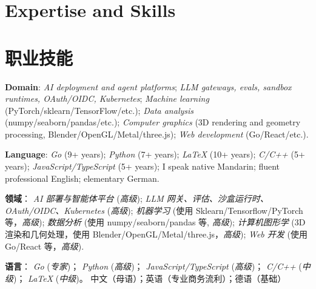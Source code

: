  {
  \section{\textbf{Expertise and Skills}}
}{
  \section{\textbf{职业技能}}
}
 {
  \small
  \resumeSubHeadingListStart
  \item{\textbf{Domain}:
  \emph{AI deployment and agent platforms};
  \emph{LLM gateways, evals, sandbox runtimes, OAuth/OIDC, Kubernetes};
  \emph{Machine learning} (PyTorch/sklearn/TensorFlow/etc.);
  \emph{Data analysis} (numpy/seaborn/pandas/etc.);
  \emph{Computer graphics} (3D rendering and geometry processing, Blender/OpenGL/Metal/three.js);
  \emph{Web development} (Go/React/etc.).
  }
  \item{\textbf{Language}:
  \emph{Go} (9+ years);
  \emph{Python} (7+ years);
  \emph{\LaTeX} (10+ years);
  \emph{C/C++} (5+ years);
  \emph{JavaScript/TypeScript} (5+ years);
  I speak native Mandarin; fluent professional English; elementary German.
  }
  \resumeSubHeadingListEnd
}{
  \small
  \resumeSubHeadingListStart
  \item{\textbf{领域}：
  \emph{AI 部署与智能体平台} (\emph{高级});
  \emph{LLM 网关、评估、沙盒运行时、OAuth/OIDC、Kubernetes} (\emph{高级});
  \emph{机器学习} (使用 Sklearn/Tensorflow/PyTorch 等，\emph{高级});
  \emph{数据分析} (使用 numpy/seaborn/pandas 等, \emph{高级});
  \emph{计算机图形学} (3D 渲染和几何处理，使用 Blender/OpenGL/Metal/three.js，\emph{高级});
  \emph{Web 开发} (使用 Go/React 等，\emph{高级}).
  }
  \item{\textbf{语言}：
  \emph{Go} (\emph{专家})；
  \emph{Python} (\emph{高级})；
  \emph{JavaScript/TypeScript} (\emph{高级})；
  \emph{C/C++} (\emph{中级})；
  \emph{\LaTeX} (\emph{中级})。
  中文（母语）；英语（专业商务流利）；德语（基础）
  }
  \resumeSubHeadingListEnd
}
